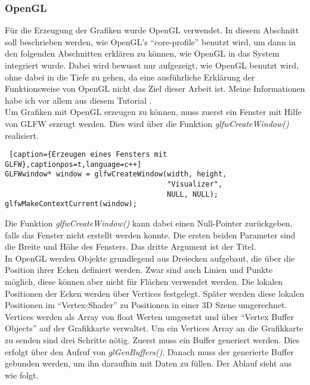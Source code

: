 \documentclass[11pt,a4paper]{article}
\begin{document}
\subsubsection{OpenGL}
Für die Erzeugung der Grafiken wurde OpenGL verwendet. In diesem Abschnitt soll beschrieben werden, wie OpenGL's ``core-profile'' benutzt wird, um dann in den folgenden Abschnitten erklären zu können, wie OpenGL in das System integriert wurde. Dabei wird bewusst nur aufgezeigt, wie OpenGL benutzt wird, ohne dabei in die Tiefe zu gehen, da eine ausführliche Erklärung der Funktionsweise von OpenGL nicht das Ziel dieser Arbeit ist. Meine Informationen habe ich vor allem aus diesem Tutorial \cite{LearnOpenGL}.\\
Um Grafiken mit OpenGL erzeugen zu können, muss zuerst ein Fenster mit Hilfe von GLFW erzeugt werden. Dies wird über die Funktion \mbox{\textit{glfwCreateWindow()}} realisiert.

\begin{lstlisting} [caption={Erzeugen eines Fensters mit GLFW},captionpos=t,language=c++]
GLFWwindow* window = glfwCreateWindow(width, height,
                                      "Visualizer",
                                      NULL, NULL);
glfwMakeContextCurrent(window);
\end{lstlisting}
\noindent
Die Funktion \mbox{\textit{glfwCreateWindow()}} kann dabei einen Null-Pointer zurückgeben, falls das Fenster nicht erstellt werden konnte. Die ersten beiden Parameter sind die Breite und Höhe des Fensters. Das dritte Argument ist der Titel.\\
In OpenGL werden Objekte grundlegend aus Dreiecken aufgebaut, die über die Position ihrer Ecken definiert werden. Zwar sind auch Linien  und Punkte möglich, diese können aber nicht für Flächen verwendet werden. Die lokalen Positionen der Ecken werden über Vertices festgelegt. Später werden diese lokalen Positionen im ``Vertex-Shader'' zu Positionen in einer 3D Szene umgerechnet.\\
Vertices werden als Array von float Werten umgesetzt und über ``Vertex Buffer Objects'' auf der Grafikkarte verwaltet. Um ein Vertices Array an die Grafikkarte zu senden sind drei Schritte nötig. Zuerst muss ein Buffer generiert werden. Dies erfolgt über den Aufruf von \mbox{\textit{glGenBuffers()}}. Danach muss der generierte Buffer gebunden werden, um ihn daraufhin mit Daten zu füllen. Der Ablauf sieht aus wie folgt.
\end{document}
